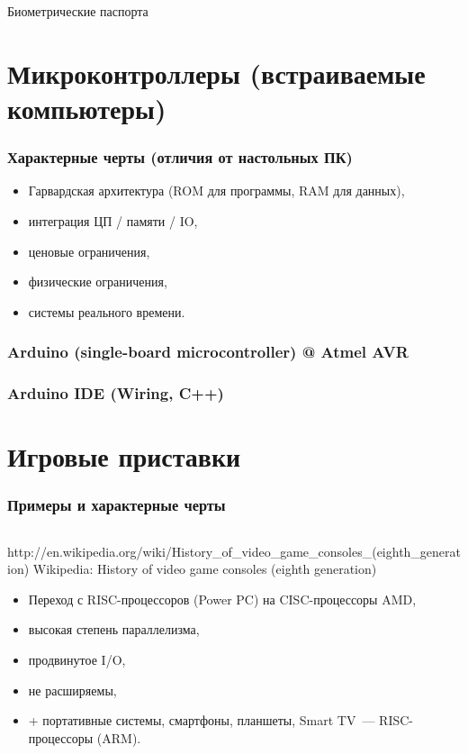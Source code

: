 \begin{frame}{Биометрические паспорта}
\end{frame}

\section {Микроконтроллеры (встраиваемые компьютеры)}

\begin{frame}
\frametitle{Характерные черты (отличия от настольных ПК)}
\begin{itemize}[<+->]
    \item Гарвардская архитектура (ROM для программы, RAM для данных),
    \item интеграция ЦП / памяти / IO,
    \item ценовые ограничения,
    \item физические ограничения,
    \item системы реального времени.
\end{itemize}
\end{frame}

\begin{frame}
\frametitle{Arduino (single-board microcontroller) @ Atmel AVR}
\end{frame}

\begin{frame}
\frametitle{Arduino IDE (Wiring, C++)}
\end{frame}

\section {Игровые приставки}

\begin{frame}
\frametitle{Примеры и характерные черты}
\begin{columns}
    \column{6cm}

    \column{6cm}
\end{columns}
\pause
\link%
    {http://en.wikipedia.org/wiki/History_of_video_game_consoles_(eighth_generation)}%
    {Wikipedia: History of video game consoles (eighth generation)}

\pause\begin{itemize}[<+->]
    \item Переход с RISC-процессоров (Power PC) на CISC-процессоры AMD,
    \item высокая степень параллелизма,
    \item продвинутое I/O,
    \item не расширяемы,
    \item + портативные системы, смартфоны, планшеты, Smart TV~— RISC-процессоры (ARM).
\end{itemize}

\end{frame}

